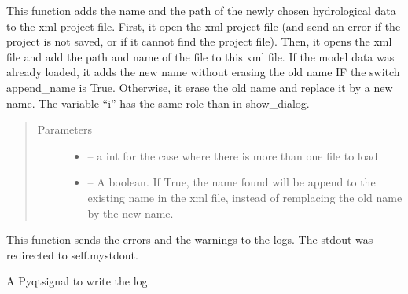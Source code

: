 \documentclass[letterpaper,10pt,english]{sphinxmanual}
\begin{document}
\begin{fulllineitems}
\begin{fulllineitems}
This function adds the name and the path of the newly chosen hydrological data to the xml project file. First,
it open the xml project file (and send an error if the project is not saved, or if it cannot find the project
file). Then, it opens the xml file and add the path and name of the file to this xml file. If the model data was
already loaded, it adds the new name without erasing the old name IF the switch append\_name is True. Otherwise,
it erase the old name and replace it by a new name. The variable “i” has the same role than in show\_dialog.
\begin{quote}\begin{description}
\item[{Parameters}] \leavevmode\begin{itemize}
\item {} 
 -- a int for the case where there is more than one file to load

\item {} 
 -- A boolean. If True, the name found will be append to the existing name in the xml file,
instead of remplacing the old name by the new name.

\end{itemize}

\end{description}\end{quote}

\end{fulllineitems}


\begin{fulllineitems}
\label{\detokenize{index:src_GUI.hydro_GUI_2.SubHydroW.send_err_log}}
This function sends the errors and the warnings to the logs.
The stdout was redirected to self.mystdout.

\end{fulllineitems}


\begin{fulllineitems}
\label{\detokenize{index:src_GUI.hydro_GUI_2.SubHydroW.send_log}}
A Pyqtsignal to write the log.

\end{fulllineitems}


\end{fulllineitems}
\end{document}
